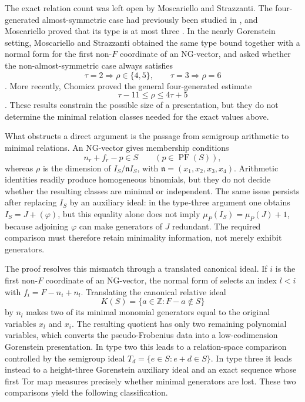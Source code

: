 \documentclass[10pt]{amsart}
\theoremstyle{plain}
\begin{document}
The exact relation count was left open by Moscariello and Strazzanti.  The
four-generated almost-symmetric case had previously been studied in
\cite{Eto17,HW19}, and Moscariello proved that its type is at most three
\cite[Theorem~1]{Moscariello16}.  In the nearly Gorenstein setting,
Moscariello and Strazzanti obtained the same type bound together with a
normal form for the first non-\(F\) coordinate of an NG-vector, and asked
whether the non-almost-symmetric case always satisfies
\[
\tau=2\Longrightarrow \rho\in\{4,5\},
\qquad
\tau=3\Longrightarrow \rho=6
\]
\cite[Proposition~1.3, Theorem~2.4, and Question~4.3]{MS21}.  More recently,
Chomicz proved the general four-generated estimate
\[
\tau-11\le\rho\le4\tau+5
\]
\cite[Theorem~1.4]{Chomicz26}.  These results constrain the possible size of
a presentation, but they do not determine the minimal relation classes
needed for the exact values above.

What obstructs a direct argument is the passage from semigroup arithmetic
to minimal relations.  An NG-vector gives membership conditions
\[
n_r+f_r-p\in S
\qquad (p\in\operatorname{PF}(S)),
\]
whereas \(\rho\) is the dimension of \(I_S/\mathfrak nI_S\), with
\(\mathfrak n=(x_1,x_2,x_3,x_4)\).  Arithmetic identities readily produce
homogeneous binomials, but they do not decide whether the resulting classes
are minimal or independent.  The same issue persists after replacing
\(I_S\) by an auxiliary ideal: in the type-three argument one obtains
\(I_S=J+(\varphi)\), but this equality alone does not imply
\(\mu_P(I_S)=\mu_P(J)+1\), because adjoining \(\varphi\) can make generators
of \(J\) redundant.  The required comparison must therefore retain
minimality information, not merely exhibit generators.

The proof resolves this mismatch through a translated canonical ideal.  If
\(i\) is the first non-\(F\) coordinate of an NG-vector, the normal form of
\cite[Proposition~1.3]{MS21} selects an index \(l<i\) with
\(f_i=F-n_i+n_l\).  Translating the canonical relative ideal
\[
K(S)=\{a\in\mathbb Z:F-a\notin S\}
\]
by \(n_l\) makes two of its minimal monomial generators equal to the
original variables \(x_l\) and \(x_i\).  The resulting quotient has only two
remaining polynomial variables, which converts the pseudo-Frobenius data
into a low-codimension Gorenstein presentation.  In type two this leads to a
relation-space comparison controlled by the semigroup ideal
\(T_d=\{e\in S:e+d\in S\}\).  In type three it leads instead to a
height-three Gorenstein auxiliary ideal and an exact sequence whose first
Tor map measures precisely whether minimal generators are lost.  These two
comparisons yield the following classification.
\end{document}
